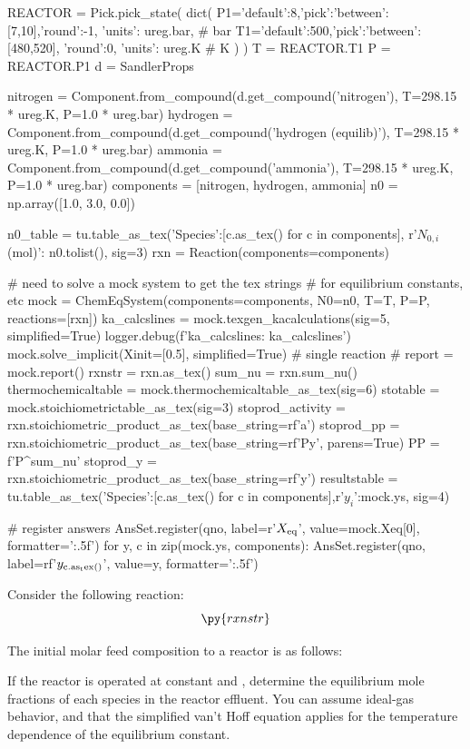 \begin{pycode}
REACTOR = Pick.pick_state(
    dict(
        P1={'default':8,'pick':{'between':[7,10],'round':-1}, 'units': ureg.bar}, # bar
        T1={'default':500,'pick':{'between':[480,520], 'round':0}, 'units': ureg.K} # K
    )
)
T = REACTOR.T1
P = REACTOR.P1
d = SandlerProps

nitrogen = Component.from_compound(d.get_compound('nitrogen'), T=298.15 * ureg.K, P=1.0 * ureg.bar)
hydrogen = Component.from_compound(d.get_compound('hydrogen (equilib)'), T=298.15 * ureg.K, P=1.0 * ureg.bar)               
ammonia = Component.from_compound(d.get_compound('ammonia'), T=298.15 * ureg.K, P=1.0 * ureg.bar)                 
components = [nitrogen, hydrogen, ammonia]
n0 = np.array([1.0, 3.0, 0.0])

n0_table = tu.table_as_tex({'Species':[c.as_tex() for c in components], r'$N_{0,i}$ (mol)': n0.tolist()}, sig=3)
rxn = Reaction(components=components)

# need to solve a mock system to get the tex strings
# for equilibrium constants, etc
mock = ChemEqSystem(components=components, N0=n0, T=T, P=P, reactions=[rxn])
ka_calcslines = mock.texgen_kacalculations(sig=5, simplified=True)
logger.debug(f'ka_calcslines: {ka_calcslines}')
mock.solve_implicit(Xinit=[0.5], simplified=True) # single reaction
# report = mock.report()
rxnstr = rxn.as_tex()
sum_nu = rxn.sum_nu()
thermochemicaltable = mock.thermochemicaltable_as_tex(sig=6)
stotable = mock.stoichiometrictable_as_tex(sig=3)
stoprod_activity = rxn.stoichiometric_product_as_tex(base_string=rf'a')
stoprod_pp = rxn.stoichiometric_product_as_tex(base_string=rf'Py', parens=True)
PP = f'P^{{{sum_nu}}}'
stoprod_y = rxn.stoichiometric_product_as_tex(base_string=rf'y')
resultstable = tu.table_as_tex({'Species':[c.as_tex() for c in components],r'$y_i$':mock.ys}, sig=4)

# register answers
AnsSet.register(qno, label=r'\(X_{\rm eq}\)', value=mock.Xeq[0], formatter='{:.5f}')
for y, c in zip(mock.ys, components):
    AnsSet.register(qno, label=rf'\(y_{{\rm {c.as_tex()}}}\)', value=y, formatter='{:.5f}')
\end{pycode}
Consider the following reaction:
\[
\py{rxnstr}
\]

The initial molar feed composition to a reactor is as follows:

\begin{center}
\end{center}

If the reactor is operated at constant  and , determine the equilibrium mole fractions of each species in the reactor effluent.  You can assume ideal-gas behavior, and that the simplified van't Hoff equation applies for the temperature dependence of the equilibrium constant.


